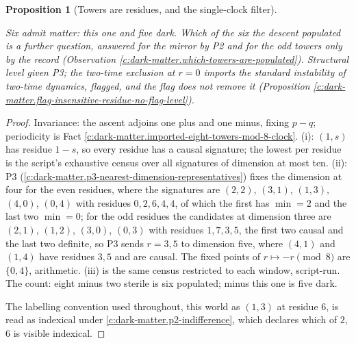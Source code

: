 \documentclass[11pt]{article}
\newtheorem{proposition}[theorem]{Proposition}
\theoremstyle{definition}
\theoremstyle{plain}
\begin{document}
\begin{proposition}[Towers are residues, and the single-clock filter]
\begin{enumerate}
\end{enumerate}
Six admit matter: this one and five dark. Which of the six the descent populated is a further question, answered for the mirror by P2 and for the odd towers only by the record (Observation \ref{c:dark-matter.which-towers-are-populated}). Structural level given P3; the two-time exclusion at $r = 0$ imports the standard instability of two-time dynamics, flagged, and the flag does not remove it (Proposition \ref{c:dark-matter.flag-insensitive-residue-no-flag-level}).
\end{proposition}
\begin{proof}
Invariance: the ascent adjoins one plus and one minus, fixing $p - q$; periodicity is Fact \ref{c:dark-matter.imported-eight-towers-mod-8-clock}. (i): $(1,s)$ has residue $1 - s$, so every residue has a causal signature; the lowest per residue is the script's exhaustive census over all signatures of dimension at most ten. (ii): P3 (\ref{c:dark-matter.p3-nearest-dimension-representatives}) fixes the dimension at four for the even residues, where the signatures are $(2,2)$, $(3,1)$, $(1,3)$, $(4,0)$, $(0,4)$ with residues $0, 2, 6, 4, 4$, of which the first has $\min = 2$ and the last two $\min = 0$; for the odd residues the candidates at dimension three are $(2,1)$, $(1,2)$, $(3,0)$, $(0,3)$ with residues $1, 7, 3, 5$, the first two causal and the last two definite, so P3 sends $r = 3, 5$ to dimension five, where $(4,1)$ and $(1,4)$ have residues $3, 5$ and are causal. The fixed points of $r \mapsto -r \pmod 8$ are $\{0, 4\}$, arithmetic. (iii) is the same census restricted to each window, script-run. The count: eight minus two sterile is six populated; minus this one is five dark.

The labelling convention used throughout, this world as $(1,3)$ at residue $6$, is read as indexical under \ref{c:dark-matter.p2-indifference}, which declares which of $2$, $6$ is visible indexical.

\end{proof}
\end{document}
